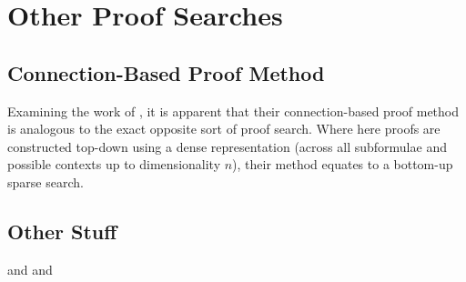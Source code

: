 \chapter{Other Proof Searches}

    \section*{Connection-Based Proof Method}
        Examining the work of \citet{connection-based-proof-method}, it is apparent that their connection-based proof method is analogous to the exact opposite sort of proof search.
        Where here proofs are constructed top-down using a dense representation (across all subformulae and possible contexts up to dimensionality $n$), their method equates to a bottom-up sparse search.


    \section*{Other Stuff}
        \citet{tableaux-for-logic-of-proofs} and
        \citet{matrices-with-connections} and
        \citet{proving-by-matings}
